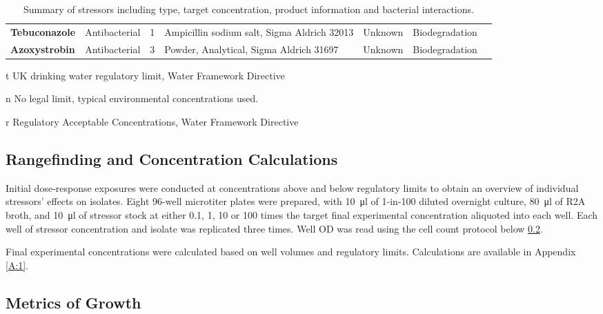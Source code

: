 \documentclass[final,1p,times]{elsarticle}
\begin{document}
\begin{landscape}
\begin{table}[ht]
\begin{threeparttable}
\begin{tabular}{l M l M L L c}
\textbf{Tebuconazole} & Antibacterial & 1 & Ampicillin sodium salt, Sigma Aldrich 32013 & Unknown & Biodegradation & \cite{Sehnem2010,Artigas2014ComparativeEcosystems} \\
\textbf{Azoxystrobin} & Antibacterial & 3 & Powder, Analytical, Sigma Aldrich 31697 & Unknown & Biodegradation & \cite{Battaglin2011Occurrence20052006,Rodrigues2013,Loos2010Pan-EuropeanWater,Bacmaga2015MicrobialAzoxystrobin} \\
\bottomrule
\end{tabular}
\caption{Summary of stressors including type, target concentration, product information and bacterial interactions.}
\label{tab:stressors}
\begin{tablenotes}
\item [t] UK drinking water regulatory limit, Water Framework Directive
\item [n] No legal limit, typical environmental concentrations used.
\item [r] Regulatory Acceptable Concentrations, Water Framework Directive 
\end{tablenotes}
\end{threeparttable}
\end{table}
\end{landscape}


\subsection{Rangefinding and Concentration Calculations}
\label{S:2:3}

Initial dose-response exposures were conducted at concentrations above and below regulatory limits to obtain an overview of individual stressors' effects on isolates. Eight 96-well microtiter plates were prepared, with  \SI{10}{\ul} of 1-in-100 diluted overnight culture, \SI{80}{\ul} of R2A broth, and \SI{10}{\ul} of stressor stock at either 0.1, 1, 10 or 100 times the target final experimental concentration aliquoted into each well. Each well of stressor concentration and isolate was replicated three times. Well OD was read using the cell count protocol below  \ref{S:2:4}.

Final experimental concentrations were calculated based on well volumes and regulatory limits. Calculations are available in Appendix \ref{A:1}.

\subsection{Metrics of Growth}
\label{S:2:4}
\end{document}
